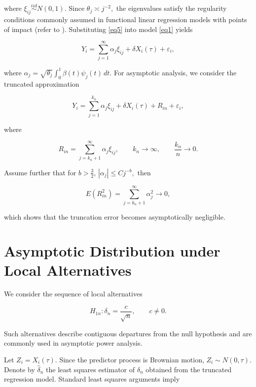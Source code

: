\documentclass[twoside]{article}
\begin{document}
	where $\xi_{ij}\stackrel{iid}{\sim}N(0,1)$. Since
	$
	\theta_j\asymp j^{-2},
	$
	the eigenvalues satisfy the regularity conditions commonly assumed in functional linear regression models with points of impact
	(refer to \citealp{Shirvani2024}).
	Substituting \eqref{eq5} into model \eqref{eq1} yields
	
	\begin{equation}\label{eq6}
		Y_i=
		\sum_{j=1}^{\infty}\alpha_j\xi_{ij}
		+
		\delta X_i(\tau)
		+
		\varepsilon_i,
	\end{equation}
	
	where
	$
	\alpha_j=
	\sqrt{\theta_j}
	\int_0^1\beta(t)\psi_j(t)\,dt.
	$
	For asymptotic analysis, we consider the truncated approximation
	
	\begin{equation}\label{eq7}
		Y_i=
		\sum_{j=1}^{k_n}\alpha_j\xi_{ij}
		+
		\delta X_i(\tau)
		+
		R_{in}
		+
		\varepsilon_i,
	\end{equation}
	
	where
	
	\[
	R_{in}=
	\sum_{j=k_n+1}^{\infty}\alpha_j\xi_{ij},
	\qquad
	k_n\to\infty,
	\qquad
	\frac{k_n}{n}\to0.
	\]
	
	Assume further that for $b>\frac32$, 
	$
	|\alpha_j|\le Cj^{-b},
	$
	then
	
	\[
	E(R_{in}^2)
	=
	\sum_{j=k_n+1}^{\infty}\alpha_j^2
	\to0,
	\]
	
	which shows that the truncation error becomes asymptotically negligible.


\section{Asymptotic Distribution under Local Alternatives}\label{sec3}

We consider the sequence of local alternatives

\begin{equation}\label{eq8}
	H_{1n}:\delta_n=\frac{c}{\sqrt n},
	\qquad
	c\neq0.
\end{equation}

Such alternatives describe contiguous departures from the null hypothesis and are commonly used in asymptotic power analysis.

Let
$
Z_i=X_i(\tau).
$
Since the predictor process is Brownian motion,
$
Z_i\sim N(0,\tau).
$
Denote by $\widehat{\delta}_n$ the least squares estimator of $\delta_n$ obtained from the truncated regression model. Standard least squares arguments imply
\end{document}
